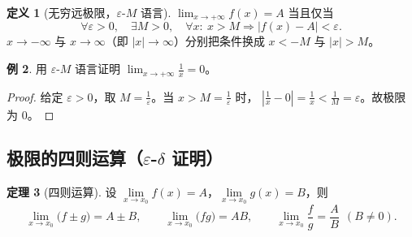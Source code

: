 \documentclass[11pt,a4paper]{ctexart}
\theoremstyle{definition}
\newtheorem{theorem}{定理}[section]
\newtheorem{example}[theorem]{例}
\newtheorem{definition}[theorem]{定义}
\theoremstyle{remark}
\newcommand{\eps}{\varepsilon}
\newcommand{\abs}[1]{\left\lvert #1 \right\rvert}
\begin{document}
\begin{definition}[无穷远极限，$\eps$-$M$ 语言]
$\displaystyle\lim_{x\to+\infty}f(x)=A$ 当且仅当
\[
  \forall\eps>0,\quad \exists M>0,\quad \forall x:\ x>M\Rightarrow\abs{f(x)-A}<\eps .
\]
$x\to-\infty$ 与 $x\to\infty$（即 $\abs x\to\infty$）分别把条件换成 $x<-M$ 与 $\abs x>M$。
\end{definition}

\begin{example}
用 $\eps$-$M$ 语言证明 $\displaystyle\lim_{x\to+\infty}\frac{1}{x}=0$。
\end{example}

\begin{proof}
给定 $\eps>0$，取 $M=\frac{1}{\eps}$。当 $x>M=\frac1\eps$ 时，
$\abs{\frac1x-0}=\frac1x<\frac{1}{M}=\eps$。故极限为 $0$。

\end{proof}

\subsection{极限的四则运算（$\eps$-$\delta$ 证明）}

\begin{theorem}[四则运算]\label{thm:arith}
设 $\lim\limits_{x\to x_0}f(x)=A$，$\lim\limits_{x\to x_0}g(x)=B$，则
\[
  \lim_{x\to x_0}\bigl(f\pm g\bigr)=A\pm B,\qquad
  \lim_{x\to x_0}\bigl(fg\bigr)=AB,\qquad
  \lim_{x\to x_0}\frac{f}{g}=\frac AB\ \ (B\neq0).
\]
\end{theorem}
\end{document}

